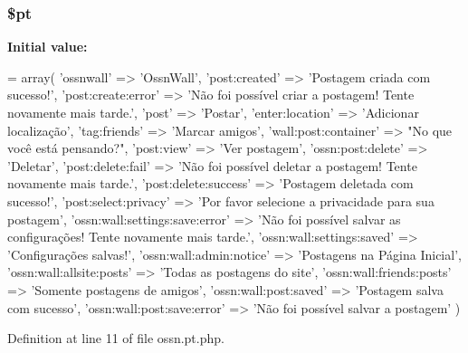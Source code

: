 \subsubsection[{\texorpdfstring{\$pt}{$pt}}]{\setlength{\rightskip}{0pt plus 5cm}\$pt}\hypertarget{components_2_ossn_wall_2locale_2ossn_8pt_8php_a62c150775a7a00e8663463c638016cad}{}\label{components_2_ossn_wall_2locale_2ossn_8pt_8php_a62c150775a7a00e8663463c638016cad}
{\bfseries Initial value\+:}
\begin{DoxyCode}
= array(
        \textcolor{stringliteral}{'ossnwall'} => \textcolor{stringliteral}{'OssnWall'},
        \textcolor{stringliteral}{'post:created'} => \textcolor{stringliteral}{'Postagem criada com sucesso!'},
        \textcolor{stringliteral}{'post:create:error'} => \textcolor{stringliteral}{'Não foi possível criar a postagem! Tente novamente mais tarde.'},
        \textcolor{stringliteral}{'post'} => \textcolor{stringliteral}{'Postar'},
        \textcolor{stringliteral}{'enter:location'} => \textcolor{stringliteral}{'Adicionar localização'},
        \textcolor{stringliteral}{'tag:friends'} => \textcolor{stringliteral}{'Marcar amigos'},
        \textcolor{stringliteral}{'wall:post:container'} => \textcolor{stringliteral}{"No que você está pensando?"},
        \textcolor{stringliteral}{'post:view'} => \textcolor{stringliteral}{'Ver postagem'},
        \textcolor{stringliteral}{'ossn:post:delete'} => \textcolor{stringliteral}{'Deletar'},
        \textcolor{stringliteral}{'post:delete:fail'} => \textcolor{stringliteral}{'Não foi possível deletar a postagem! Tente novamente mais tarde.'},
        \textcolor{stringliteral}{'post:delete:success'} => \textcolor{stringliteral}{'Postagem deletada com sucesso!'},
        \textcolor{stringliteral}{'post:select:privacy'} => \textcolor{stringliteral}{'Por favor selecione a privacidade para sua postagem'},
        \textcolor{stringliteral}{'ossn:wall:settings:save:error'} => \textcolor{stringliteral}{'Não foi possível salvar as configurações! Tente novamente mais
       tarde.'},
        \textcolor{stringliteral}{'ossn:wall:settings:saved'} => \textcolor{stringliteral}{'Configurações salvas!'},
        \textcolor{stringliteral}{'ossn:wall:admin:notice'} => \textcolor{stringliteral}{'Postagens na Página Inicial'},
        \textcolor{stringliteral}{'ossn:wall:allsite:posts'} => \textcolor{stringliteral}{'Todas as postagens do site'},
        \textcolor{stringliteral}{'ossn:wall:friends:posts'} => \textcolor{stringliteral}{'Somente postagens de amigos'},
        \textcolor{stringliteral}{'ossn:wall:post:saved'} => \textcolor{stringliteral}{'Postagem salva com sucesso'},
        \textcolor{stringliteral}{'ossn:wall:post:save:error'} => \textcolor{stringliteral}{'Não foi possível salvar a postagem'}
)
\end{DoxyCode}


Definition at line 11 of file ossn.\+pt.\+php.

